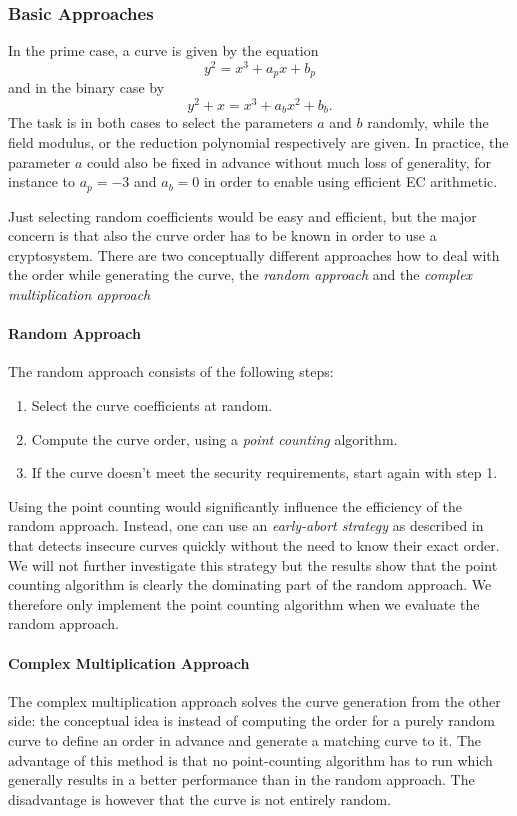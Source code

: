 \documentclass[11pt,english]{article}
\begin{document}
\subsubsection{Basic Approaches}
In the prime case, a curve is given by the equation
\begin{displaymath}
 y^2=x^3+a_px+b_p
\end{displaymath}
and in the binary case by
\begin{displaymath}
 y^2+x=x^3+a_bx^2+b_b.
\end{displaymath}
The task is in both cases to select the parameters $a$ and $b$ randomly, while the field modulus, or the reduction polynomial respectively are given. In practice, the parameter $a$ could also be fixed in advance without much loss of generality, for instance to $a_p=-3$ and $a_b=0$ in order to enable using efficient EC arithmetic.

Just selecting random coefficients would be easy and efficient, but the major concern is that also the curve order has to be known in order to use a cryptosystem. There are two conceptually different approaches how to deal with the order while generating the curve, the \emph{random approach} and the \emph{complex multiplication approach}

\paragraph{Random Approach}
The random approach consists of the following steps:
\begin{enumerate}
 \item Select the curve coefficients at random.
 \item Compute the curve order, using a \emph{point counting} algorithm.
 \item If the curve doesn't meet the security requirements, start again with step 1.
\end{enumerate}


Using the point counting would significantly influence the efficiency of the random approach. Instead, one can use an \emph{early-abort strategy} as described in \cite{satohfgh} that detects insecure curves quickly without the need to know their exact order. We will not further investigate this strategy but the results show that the point counting algorithm is clearly the dominating part of the random approach. We therefore only implement the point counting algorithm when we evaluate the random approach.

\paragraph{Complex Multiplication Approach}
The complex multiplication approach solves the curve generation from the other side: the conceptual idea is instead of computing the order for a purely random curve to define an order in advance and generate a matching curve to it.
The advantage of this method is that no point-counting algorithm has to run which generally results in a better performance than in the random approach. The disadvantage is however that the curve is not entirely random.
\end{document}
